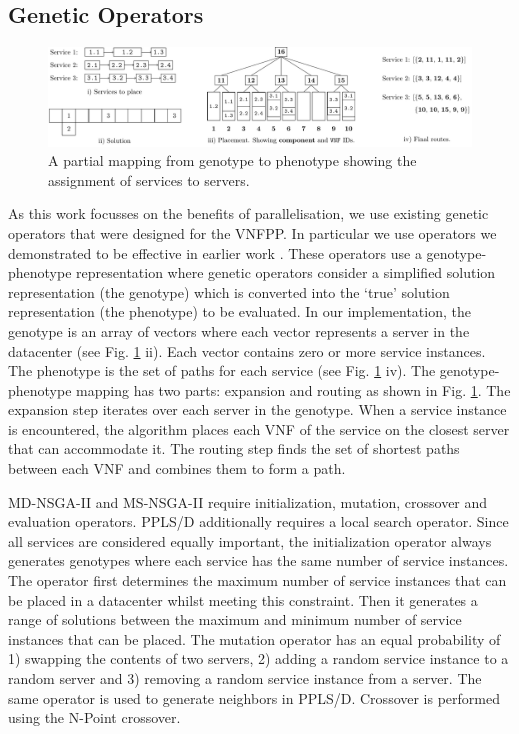\subsection{Genetic Operators}

\begin{figure}[t]
    \includegraphics[width=\textwidth]{figures/algorithms/mapping}
    \caption{A partial mapping from genotype to phenotype showing the assignment of services to servers.}
    \label{fig:mapping}
\end{figure}

As this work focusses on the benefits of parallelisation, we use existing genetic operators that were designed for the VNFPP. In particular we use operators we demonstrated to be effective in earlier work \cite{BillingsleyLMMG20}. These operators use a genotype-phenotype representation where genetic operators consider a simplified solution representation (the genotype) which is converted into the `true' solution representation (the phenotype) to be evaluated. In our implementation, the genotype is an array of vectors where each vector represents a server in the datacenter (see Fig. \ref{fig:mapping} ii). Each vector contains zero or more service instances. The phenotype is the set of paths for each service (see Fig. \ref{fig:mapping} iv). The genotype-phenotype mapping has two parts: expansion and routing as shown in Fig. \ref{fig:mapping}. The expansion step iterates over each server in the genotype. When a service instance is encountered, the algorithm places each VNF of the service on the closest server that can accommodate it. The routing step finds the set of shortest paths between each VNF and combines them to form a path.

MD-NSGA-II and MS-NSGA-II require initialization, mutation, crossover and evaluation operators. PPLS/D additionally requires a local search operator. Since all services are considered equally important, the initialization operator always generates genotypes where each service has the same number of service instances. The operator first determines the maximum number of service instances that can be placed in a datacenter whilst meeting this constraint. Then it generates a range of solutions between the maximum and minimum number of service instances that can be placed. The mutation operator has an equal probability of 1) swapping the contents of two servers, 2) adding a random service instance to a random server and 3) removing a random service instance from a server. The same operator is used to generate neighbors in PPLS/D. Crossover is performed using the N-Point crossover.